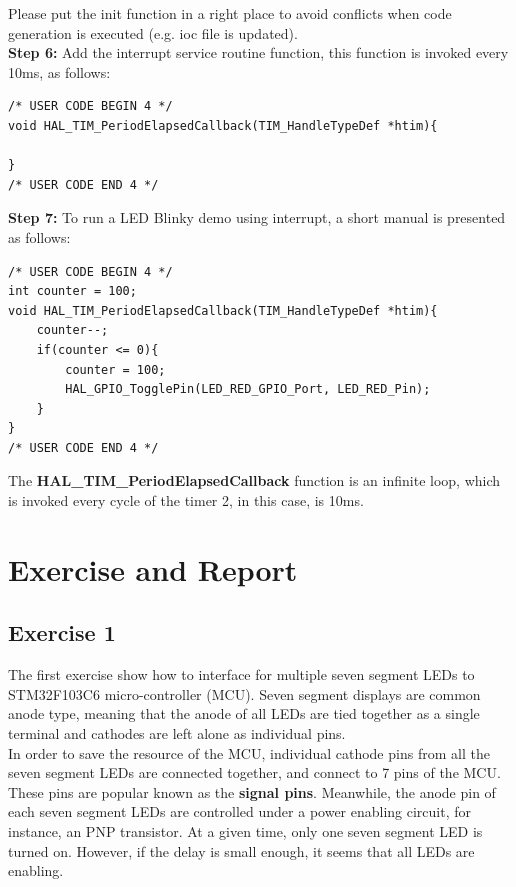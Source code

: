 Please put the init function in a right place to avoid conflicts when code generation is executed (e.g. ioc file is updated).\\
\newpage
\textbf{Step 6: } Add the interrupt service routine function, this function is invoked every 10ms, as follows:

\begin{lstlisting}[caption=Add an interrupt service routine]
/* USER CODE BEGIN 4 */
void HAL_TIM_PeriodElapsedCallback(TIM_HandleTypeDef *htim){
	
}
/* USER CODE END 4 */
\end{lstlisting}

\textbf{Step 7: } To run a LED Blinky demo using interrupt, a short manual is presented as follows:
\begin{lstlisting}[caption=LED Blinky using timer interrupt]
/* USER CODE BEGIN 4 */
int counter = 100;
void HAL_TIM_PeriodElapsedCallback(TIM_HandleTypeDef *htim){
	counter--;
	if(counter <= 0){
		counter = 100;
		HAL_GPIO_TogglePin(LED_RED_GPIO_Port, LED_RED_Pin);
	}
}
/* USER CODE END 4 */
\end{lstlisting}

The \textbf{HAL\_TIM\_PeriodElapsedCallback} function is an infinite loop, which is invoked every cycle of the timer 2, in this case, is 10ms.\\



\newpage
\section{Exercise and Report}
\subsection{Exercise 1}
The first exercise show how to interface for multiple seven segment LEDs to STM32F103C6 micro-controller (MCU). Seven segment displays are common anode type, meaning that the anode of all LEDs are tied together as a single terminal and cathodes are left alone as individual pins. \\

In order to save the resource of the MCU, individual cathode pins from all the seven segment LEDs are connected together, and connect to 7 pins of the MCU. These pins are popular known as the \textbf{signal pins}. Meanwhile, the anode pin of each seven segment LEDs are controlled under a power enabling circuit, for instance, an PNP transistor. At a given time, only one seven segment LED is turned on. However, if the delay is small enough, it seems that all LEDs are enabling. \\


